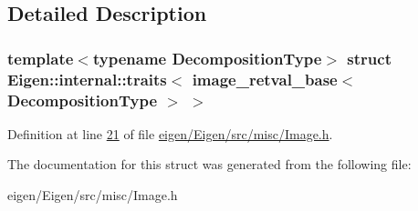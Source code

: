 \subsection{Detailed Description}
\subsubsection*{template$<$typename Decomposition\+Type$>$\newline
struct Eigen\+::internal\+::traits$<$ image\+\_\+retval\+\_\+base$<$ Decomposition\+Type $>$ $>$}



Definition at line \hyperlink{eigen_2_eigen_2src_2misc_2_image_8h_source_l00021}{21} of file \hyperlink{eigen_2_eigen_2src_2misc_2_image_8h_source}{eigen/\+Eigen/src/misc/\+Image.\+h}.



The documentation for this struct was generated from the following file\+:\begin{DoxyCompactItemize}
\item 
eigen/\+Eigen/src/misc/\+Image.\+h\end{DoxyCompactItemize}
